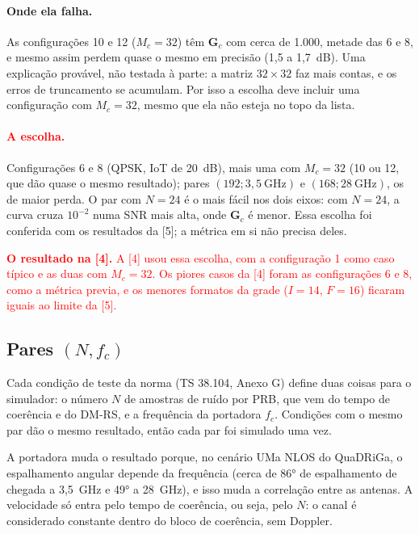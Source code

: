 \documentclass[11pt]{article}
\newcommand{\novo}[1]{\textcolor{red}{#1}}
\begin{document}
\paragraph{Onde ela falha.} As configurações 10 e 12 ($M_c = 32$) têm $\mathbf G_c$ com cerca de
1.000, metade das 6 e 8, e mesmo assim perdem quase o mesmo em precisão (1,5 a 1,7~dB). Uma
explicação provável, não testada à parte: a matriz $32 \times 32$ faz mais contas, e os erros de
truncamento se acumulam. Por isso a escolha deve incluir uma configuração com $M_c = 32$, mesmo
que ela não esteja no topo da lista.

\paragraph{\novo{A escolha.}} Configurações 6 e 8 (QPSK, IoT de 20~dB), mais uma
com $M_c = 32$ (10 ou 12, que dão quase o mesmo resultado); pares $(192; 3{,}5~\text{GHz})$ e
$(168; 28~\text{GHz})$, os de maior perda. O par com $N = 24$ é o mais fácil
nos dois eixos: com $N = 24$, a curva cruza $10^{-2}$ numa SNR mais alta, onde $\mathbf G_c$ é
menor. Essa escolha foi conferida com os resultados da [5]; a métrica em si não precisa deles.

\novo{\textbf{O resultado na [4].} A [4] usou essa escolha, com a configuração 1 como caso
típico e as duas com $M_c = 32$. Os piores casos da [4] foram as configurações 6 e 8, como a
métrica previa, e os menores formatos da grade ($I = 14$, $F = 16$) ficaram iguais ao limite
da [5].}

\subsection*{Pares $(N, f_c)$}

Cada condição de teste da norma (TS 38.104, Anexo G) define duas coisas para o simulador:
o número $N$ de amostras de ruído por PRB, que vem do tempo de coerência e do DM-RS, e a
frequência da portadora $f_c$. Condições com o mesmo par dão o mesmo resultado, então cada
par foi simulado uma vez.

A portadora muda o resultado porque, no cenário UMa NLOS do QuaDRiGa, o espalhamento angular
depende da frequência (cerca de 86° de espalhamento de chegada a 3,5~GHz e 49° a 28~GHz), e
isso muda a correlação entre as antenas. A velocidade só entra pelo tempo de coerência, ou seja,
pelo $N$: o canal é considerado constante dentro do bloco de coerência, sem Doppler.
\end{document}
